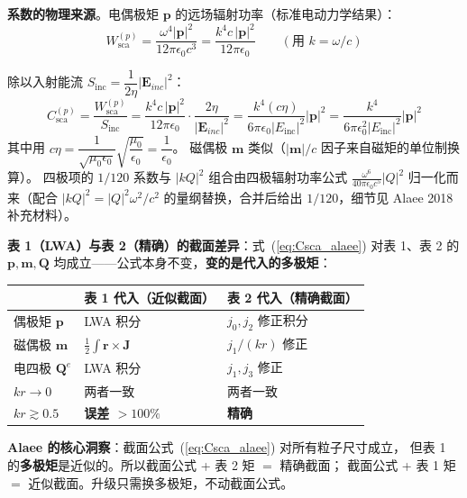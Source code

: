 \textbf{系数的物理来源}。电偶极矩 $\mathbf{p}$ 的远场辐射功率（标准电动力学结果）：
\begin{equation}
  W_{\text{sca}}^{(p)} = \frac{\omega^4|\mathbf{p}|^2}{12\pi\epsilon_0 c^3}
  = \frac{k^4 c\,|\mathbf{p}|^2}{12\pi\epsilon_0}
  \qquad(\text{用 } k = \omega/c)
\end{equation}

除以入射能流 $S_{\text{inc}} = \dfrac{1}{2\eta}|\mathbf{E}_{inc}|^2$：
\begin{equation}
  C_{\text{sca}}^{(p)} = \frac{W_{\text{sca}}^{(p)}}{S_{\text{inc}}}
  = \frac{k^4 c\,|\mathbf{p}|^2}{12\pi\epsilon_0}\cdot\frac{2\eta}{|\mathbf{E}_{inc}|^2}
  = \frac{k^4(c\eta)}{6\pi\epsilon_0|E_{\text{inc}}|^2}|\mathbf{p}|^2
  = \frac{k^4}{6\pi\epsilon_0^2|E_{\text{inc}}|^2}|\mathbf{p}|^2
\end{equation}
其中用 $c\eta = \dfrac{1}{\sqrt{\mu_0\epsilon_0}}\sqrt{\dfrac{\mu_0}{\epsilon_0}} = \dfrac{1}{\epsilon_0}$。
磁偶极 $\mathbf{m}$ 类似（$|\mathbf{m}|/c$ 因子来自磁矩的单位制换算）。
四极项的 $1/120$ 系数与 $|kQ|^2$ 组合由四极辐射功率公式
$\frac{\omega^6}{40\pi\epsilon_0 c^5}|Q|^2$ 归一化而来（配合 $|kQ|^2=|Q|^2\omega^2/c^2$
的量纲替换，合并后给出 $1/120$，细节见 Alaee 2018 补充材料）。

\textbf{表 1（LWA）与表 2（精确）的截面差异}：式~(\ref{eq:Csca_alaee}) 对表 1、表 2 的
$\mathbf{p},\mathbf{m},\mathbf{Q}$ 均成立——公式本身不变，\textbf{变的是代入的多极矩}：

\begin{center}
\begin{tabular}{lll}
\toprule
& \textbf{表 1 代入（近似截面）} & \textbf{表 2 代入（精确截面）} \\
\midrule
偶极矩 $\mathbf{p}$ & LWA 积分 & $j_0,j_2$ 修正积分 \\
磁偶极 $\mathbf{m}$ & $\frac12\int\mathbf{r}\times\mathbf{J}$ & $j_1/(kr)$ 修正 \\
电四极 $\mathbf{Q}^e$ & LWA 积分 & $j_1,j_3$ 修正 \\
\midrule
$kr\to0$ & 两者一致 & 两者一致 \\
$kr\gtrsim0.5$ & \textbf{误差 $>100\%$} & \textbf{精确} \\
\bottomrule
\end{tabular}
\end{center}

\begin{nontrivial}
\textbf{Alaee 的核心洞察}：截面公式~(\ref{eq:Csca_alaee}) 对所有粒子尺寸成立，
但表 1 的\textbf{多极矩}是近似的。所以截面公式 + 表 2 矩 $=$ 精确截面；
截面公式 + 表 1 矩 $=$ 近似截面。升级只需换多极矩，不动截面公式。
\end{nontrivial}

